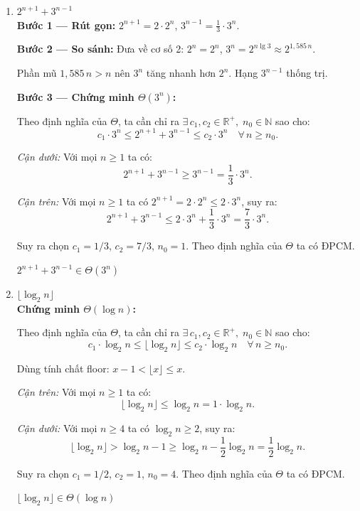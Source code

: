 \documentclass[12pt,a4paper]{article}
\begin{document}
\begin{enumerate}[label=\textbf{\alph*.}]
  \bigskip

  \item $2^{n+1} + 3^{n-1}$ \\[4pt]
  \textbf{Bước 1 --- Rút gọn:} $2^{n+1} = 2 \cdot 2^n$, $3^{n-1} = \frac{1}{3} \cdot 3^n$.

  \textbf{Bước 2 --- So sánh:} Đưa về cơ số 2: $2^n = 2^n$, $3^n = 2^{n\lg 3} \approx 2^{1{,}585\,n}$.

  Phần mũ $1{,}585\,n > n$ nên $3^n$ tăng nhanh hơn $2^n$. Hạng $3^{n-1}$ thống trị.

  \textbf{Bước 3 --- Chứng minh $\Theta(3^n)$:}

  Theo định nghĩa của $\Theta$, ta cần chỉ ra $\exists\, c_1, c_2 \in \mathbb{R}^+,\; n_0 \in \mathbb{N}$ sao cho:
  \[
    c_1 \cdot 3^n \leq 2^{n+1} + 3^{n-1} \leq c_2 \cdot 3^n \quad \forall\, n \geq n_0.
  \]

  \textit{Cận dưới:} Với mọi $n \geq 1$ ta có:
  \[
    2^{n+1} + 3^{n-1} \geq 3^{n-1} = \frac{1}{3} \cdot 3^n.
  \]

  \textit{Cận trên:} Với mọi $n \geq 1$ ta có $2^{n+1} = 2 \cdot 2^n \leq 2 \cdot 3^n$, suy ra:
  \[
    2^{n+1} + 3^{n-1} \leq 2 \cdot 3^n + \frac{1}{3} \cdot 3^n = \frac{7}{3} \cdot 3^n.
  \]

  Suy ra chọn $c_1 = 1/3$, $c_2 = 7/3$, $n_0 = 1$. Theo định nghĩa của $\Theta$ ta có ĐPCM.

  \begin{resultbox}
  $2^{n+1} + 3^{n-1} \in \Theta(3^n)$
  \end{resultbox}

  \bigskip

  \item $\lfloor\log_2 n\rfloor$ \\[4pt]
  \textbf{Chứng minh $\Theta(\log n)$:}

  Theo định nghĩa của $\Theta$, ta cần chỉ ra $\exists\, c_1, c_2 \in \mathbb{R}^+,\; n_0 \in \mathbb{N}$ sao cho:
  \[
    c_1 \cdot \log_2 n \leq \lfloor\log_2 n\rfloor \leq c_2 \cdot \log_2 n \quad \forall\, n \geq n_0.
  \]

  Dùng tính chất floor: $x - 1 < \lfloor x \rfloor \leq x$.

  \textit{Cận trên:} Với mọi $n \geq 1$ ta có:
  \[
    \lfloor\log_2 n\rfloor \leq \log_2 n = 1 \cdot \log_2 n.
  \]

  \textit{Cận dưới:} Với mọi $n \geq 4$ ta có $\log_2 n \geq 2$, suy ra:
  \[
    \lfloor\log_2 n\rfloor > \log_2 n - 1 \geq \log_2 n - \frac{1}{2}\log_2 n = \frac{1}{2}\log_2 n.
  \]

  Suy ra chọn $c_1 = 1/2$, $c_2 = 1$, $n_0 = 4$. Theo định nghĩa của $\Theta$ ta có ĐPCM.

  \begin{resultbox}
  $\lfloor\log_2 n\rfloor \in \Theta(\log n)$
  \end{resultbox}

\end{enumerate}
\end{document}
